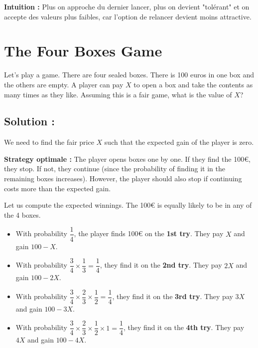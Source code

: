 \textbf{Intuition :} Plus on approche du dernier lancer, plus on devient "tolérant" et on accepte des valeurs plus faibles, car l'option de relancer devient moins attractive.





\section{The Four Boxes Game}

\begin{exerciseBox}
Let's play a game. There are four sealed boxes. There is 100 euros in one box and the others are empty. A player can pay $X$ to open a box and take the contents as many times as they like. Assuming this is a fair game, what is the value of $X$?
\end{exerciseBox}



\subsection*{Solution :}

We need to find the fair price $X$ such that the expected gain of the player is zero.

\textbf{Strategy optimale :} The player opens boxes one by one. If they find the 100€, they stop. If not, they continue (since the probability of finding it in the remaining boxes increases). However, the player should also stop if continuing costs more than the expected gain.

\bigskip

Let us compute the expected winnings. The 100€ is equally likely to be in any of the 4 boxes.

\begin{itemize}
    \item With probability $\dfrac{1}{4}$, the player finds 100€ on the \textbf{1st try}. They pay $X$ and gain $100 - X$.
    \item With probability $\dfrac{3}{4} \times \dfrac{1}{3} = \dfrac{1}{4}$, they find it on the \textbf{2nd try}. They pay $2X$ and gain $100 - 2X$.
    \item With probability $\dfrac{3}{4} \times \dfrac{2}{3} \times \dfrac{1}{2} = \dfrac{1}{4}$, they find it on the \textbf{3rd try}. They pay $3X$ and gain $100 - 3X$.
    \item With probability $\dfrac{3}{4} \times \dfrac{2}{3} \times \dfrac{1}{2} \times 1 = \dfrac{1}{4}$, they find it on the \textbf{4th try}. They pay $4X$ and gain $100 - 4X$.
\end{itemize}


